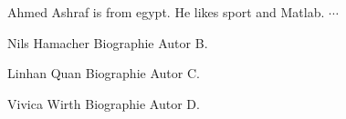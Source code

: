 \documentclass[journal,final,a4paper,twoside]{PS}
\begin{document}
\begin{biography}
{Ahmed Ashraf} is from egypt. He likes sport and Matlab.
$\cdots$
\end{biography}
\begin{biography}
{Nils Hamacher}
Biographie Autor B.
\end{biography}
\begin{biography}
{Linhan Quan}
Biographie Autor C.

\end{biography}

\begin{biographynophoto}
{Vivica Wirth}
Biographie Autor D.

\end{biographynophoto}
\end{document}

